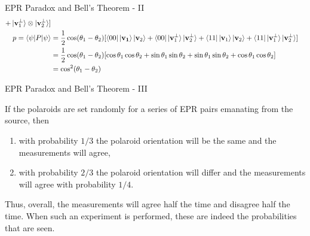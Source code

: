 \documentclass{beamer}
\begin{document}
\begin{frame}{EPR Paradox and Bell's Theorem - II\tiny{\cite{solutionofexercise420}}}
{\begin{align*}
         + \ket{\mathbf{v}_1^{\perp}} \otimes \ket{\mathbf{v}_2^{\perp}}
         ]
      \\
      p = \braket{\psi|P|\psi}
      &= \frac{1}{2} \cos (\theta_1 - \theta_2) [ \bra{00} \ket{\mathbf{v_1}} \ket{\mathbf{v}_2}
                                                + \bra{00} \ket{\mathbf{v}_1^{\perp}} \ket{\mathbf{v}_2^{\perp}}
                                                + \bra{11} \ket{\mathbf{v}_1} \ket{\mathbf{v}_2}
                                                + \bra{11} \ket{\mathbf{v}_1^{\perp}} \ket{\mathbf{v}_2^{\perp}}
                                                ] \\
      &= \frac{1}{2} \cos (\theta_1 - \theta_2) [ \cos \theta_1 \cos \theta_2
                                                + \sin \theta_1 \sin \theta_2
                                                + \sin \theta_1 \sin \theta_2
                                                + \cos \theta_1 \cos \theta_2
                                                ] \\
      &= \cos^2 (\theta_1 - \theta_2)
    \end{align*}
  }%
\end{frame}

\begin{frame}{EPR Paradox and Bell's Theorem - III}
  {\tiny
    If the polaroids are set randomly for a series of EPR pairs emanating from the source, then
    \begin{enumerate}[I]
    \item with probability $1/3$ the polaroid orientation will be the same and the measurements will agree,
    \item with probability $2/3$ the polaroid orientation will differ and the measurements will agree with probability $1/4$.
    \end{enumerate}
  }%
  Thus, overall, the measurements will agree half the time and disagree half the time. When such
  an experiment is performed, these are indeed the probabilities that are seen.
\end{frame}
\end{document}
